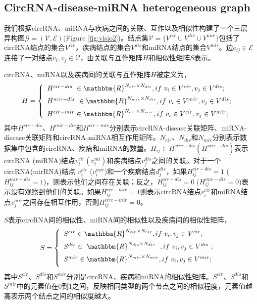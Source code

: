 \documentclass{bioinfo}
\begin{document}
\begin{methods}
\vspace{0.3cm}


\subsection{CircRNA-disease-miRNA heterogeneous graph}
我们根据circRNA、miRNA与疾病之间的关联、互作以及相似性构建了一个三层异构图$\mathcal{G}=(\mathcal{V}, \mathcal{E})$(Figure \ref{fig:visio2})。结点集$\mathcal{V}=\{V^{cir}\cup V^{dis}\cup V^{mir}\}$包括了circRNA结点的集合$V^{cir}$，疾病结点的集合$V^{dis}$和miRNA结点的集合$V^{mir}$。边$e_{ij} \in \mathcal{E}$连接了一对结点$v_i,v_j \in \mathcal{V}$，由关联与互作矩阵$H$和相似性矩阵$S$表示。

circRNA、miRNA以及疾病间的关联与互作矩阵$H$被定义为，
\begin{equation}
H = \left\{ \begin{array}{l}
{H^{cir-dis}}\ \in {\mathbbm{R}^{N_{cir}\times N_{dis}}},if\ {v_i} \in {V^{cir}},{v_j} \in {V^{dis}};\\[5pt]
{H^{mir-dis}}\ \in {\mathbbm{R}^{N_{mir}\times N_{dis}}},if\ {v_i} \in {V^{mir}},{v_j} \in {V^{dis}};\\[5pt]
{H^{cir-mir}} \in {\mathbbm{R}^{N_{cir}\times N_{mir}}},if\ {v_i} \in {V^{cir}},{v_j} \in {V^{mir}};\\
\end{array} \right.
\end{equation}
其中$H^{cir-dis}$、$H^{mir-dis}$和$H^{cir-mir}$分别表示circRNA-disease关联矩阵、miRNA-disease关联矩阵和circRNA-miRNA相互作用矩阵。$N_{cir}$、$N_{dis}$和$N_{mir}$分别表示数据集中包含的circRNA、疾病和miRNA的数量。$H_{ij} \in H^{circ-dis} (H^{mir-dis})$表示circRNA (miRNA)结点$v_i^{cir}(v_i^{mi})$和疾病结点$v_j^{dis}$之间的关联。对于一个circRNA(mirRNA)结点 $v_i^{cir}$ ($v_i^{mir}$)和一个疾病结点$d_j^{dis}$，如果$H_{ij}^{cir-dis}=1$ ($H_{ij}^{mir-dis}=1$)，则表示他们之间存在关联；反之，$H_{ij}^{cir-dis}=0$ ($H_{ij}^{mir-dis}=0$)表示没有观察到他们的关联。如果$H_{ij}^{cir-mir}=1$则表示circRNA结点$v_i^{cir}$和miRNA结点$v_j^{mir}$之间存在相互作用，否则$H_{ij}^{circ-mir}=0$。

$S$表示circRNA间的相似性、miRNA间的相似性以及疾病间的相似性矩阵，
\begin{equation}
S = \left\{ \begin{array}{l}
{S^{cir}} \in {\mathbbm{R}^{N_{cir}\times N_{cir}}},if\ {v_i},{v_j} \in {V^{cir}};\\[5pt]
{S^{dis}} \in {\ \mathbbm{R}^{N_{dis}\times N_{dis}}}\ \ ,if\ {v_i},{v_j} \in {V^{dis}}\ ;\\[5pt]
{S^{mir}} \in {\mathbbm{R}^{N_{mir}\times N_{mir}}},if\ {v_i},{v_j} \in {V^{mir}};\\[5pt]
\end{array} \right.
\end{equation}
其中$S^{cir}$、$S^{dis}$和$S^{mir}$分别是circRNA、疾病和miRNA的相似性矩阵。$S^{cir}$、$S^{dis}$和$S^{mir}$中的元素值在0到1之间，反映相同类型的两个节点之间的相似程度，元素值越高表示两个结点之间的相似度越大。


\end{methods}
\end{document}
